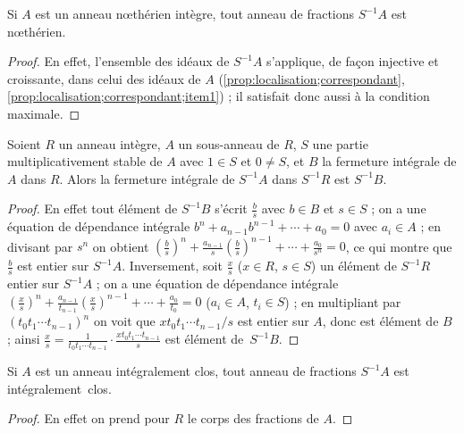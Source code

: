 \documentclass[11pt, useosf,
  title in boldface,
  theorem in new line,
  theorem numbering = section,
  number theorems separately,
]{simplivre}
\begin{document}
    \begin{corollary}\label{cor:localisation d'un anneau nœthérien est nœthérien}
        Si \( A \) est un anneau nœthérien intègre, tout anneau de fractions \( S^{-1}A \) est nœthérien.
    \end{corollary}
    \begin{proof}
        En effet, l'ensemble des idéaux de \( S^{-1} A \) s'applique, de façon injective et croissante, dans celui des idéaux de \( A \) (\cref{prop:localisation;correspondant}, \ref{prop:localisation;correspondant;item1}) ; il satisfait donc aussi à la condition maximale.
    \end{proof}

    \begin{proposition}\label{prop:fermeture de la localisation est localisé de la fermeture intégrale}
        Soient \( R \) un anneau intègre, \( A \) un sous-anneau de \( R \), \( S \) une partie multiplicativement stable de \( A \) avec \( 1 \in S \) et \( 0 \neq S \), et \( B \) la fermeture intégrale de \( A \) dans \( R \). Alors la fermeture intégrale de \( S^{-1} A \) dans \( S^{-1} R \) est \( S^{-1} B \).
    \end{proposition}
    \begin{proof}
        En effet tout élément de \( S^{-1} B \) s'écrit \( \frac{b}{s} \) avec \( b \in B \) et \( s \in S \) ; on a une équation de dépendance intégrale \( b^n + a_{n-1} b^{n-1} + \cdots + a_0 = 0 \) avec \( a_i \in A \) ; en divisant par \( s^n \) on obtient \( \left(\frac{b}{s}\right)^n + \frac{a_{n-1}}{s} \left(\frac{b}{s}\right)^{n-1} + \cdots + \frac{a_0}{s^n} = 0 \), ce qui montre que \( \frac{b}{s} \) est entier sur \( S^{-1} A \). Inversement, soit \( \frac{x}{s} \) (\( x \in R \), \( s \in S \)) un élément de \( S^{-1} R \) entier sur \( S^{-1} A \) ; on a une équation de dépendance intégrale \( \left(\frac{x}{s}\right)^n + \frac{a_{n-1}}{t_{n-1}} \left(\frac{x}{s}\right)^{n-1} + \cdots + \frac{a_0}{t_0} = 0 \) (\( a_i \in A \), \( t_i \in S \)) ; en multipliant par \( (t_0 t_1 \cdots t_{n-1})^n \) on voit que \( x t_0 t_1 \cdots t_{n-1} / s \) est entier sur \( A \), donc est élément de \( B \) ; ainsi \( \frac{x}{s} = \frac{1}{t_0 t_1 \cdots t_{n-1}} \cdot \frac{x t_0 t_1 \cdots t_{n-1}}{s} \) est élément de~\( S^{-1} B \).
    \end{proof}

    \begin{corollary}\label{cor:localisation d'un anneau intégralement clos est intégralement clos}
        Si \( A \) est un anneau intégralement clos, tout anneau de fractions \( S^{-1} A \) est intégralement~clos.
    \end{corollary}
    \begin{proof}
        En effet on prend pour \( R \) le corps des fractions de \( A \).
    \end{proof}
\end{document}
